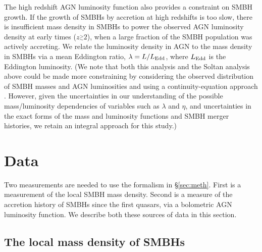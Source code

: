 \documentclass[twocolumn]{aastex631}
\begin{document}
The high redshift AGN luminosity function also provides a constraint on SMBH growth. If the growth of SMBHs by accretion at high redshifts is too slow, there is insufficient mass density in SMBHs to power the observed AGN luminosity density at early times ($z\stackrel{>}{_{\sim}}2$), when a large fraction of the SMBH population was actively accreting. We relate the luminosity density in AGN to the mass density in SMBHs via a mean Eddington ratio, $\lambda=L/L_{\rm Edd}$, where $L_{\rm Edd}$ is the Eddington luminosity. (We note that both this analysis and the Soltan analysis above could be made more constraining by considering the observed distribution of SMBH masses and AGN luminosities and using a continuity-equation approach \citep[e.g.][] {raimundo12,2017A&A...600A..64T}. However, given the uncertainties in our understanding of the possible mass/luminosity dependencies of variables such as $\lambda$ and $\eta$, and uncertainties in the exact forms of the mass and luminosity functions and SMBH merger histories, we retain an integral approach for this study.)

\section{Data}\label{sec:data}
Two measurements are needed to use the formalism in \S\ref{sec:meth}. First is a measurement of the local SMBH mass density. Second is a measure of the accretion history of SMBHs since the first quasars, via a bolometric AGN luminosity function. We describe both these sources of data in this section. 

\subsection{The local mass density of SMBHs}\label{sec:bhdensity}
\end{document}
